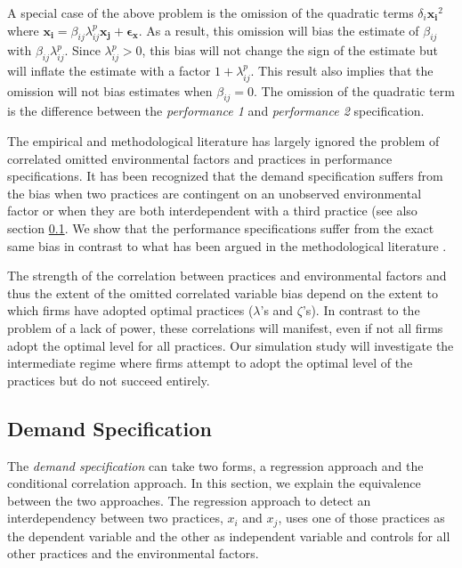 \documentclass[12pt]{article}
\begin{document}
A special case of the above problem is the omission of the quadratic terms $\delta_i \mathbf{x_i}^2$ where $\mathbf{x_i} =  \beta_{ij} \lambda^p_{ij} \mathbf{x_j} + \mathbf{\epsilon_x}$. As a result, this omission will bias the estimate of $\beta_{ij}$ with $\beta_{ij} \lambda^p_{ij}$. Since $\lambda^p_{ij} > 0$, this bias will not change the sign of the estimate but will inflate the estimate with a factor $1 + \lambda^p_{ij}$.  This result also implies that the omission will not bias estimates when $\beta_{ij} = 0$. The omission of the quadratic term is the difference between the \emph{performance 1} and \emph{performance 2} specification.

The empirical and methodological literature has largely ignored the problem of correlated omitted environmental factors and practices in performance specifications. It has been recognized that the demand specification suffers from the bias when two practices are contingent on an unobserved environmental factor or when they are both interdependent with a third practice (see also section \ref{demand-specification}. We show that the performance specifications suffer from the exact same bias in contrast to what has been argued in the methodological literature \citep{Carree2011}. 

The strength of the correlation between practices and environmental factors and thus the extent of the omitted correlated variable bias depend on the extent to which firms have adopted optimal practices ($\lambda$'s and $\zeta$'s). In contrast to the problem of a lack of power, these correlations will manifest, even if not all firms adopt the optimal level for all practices. Our simulation study will investigate the intermediate regime where firms attempt to adopt the optimal level of the practices but do not succeed entirely.

\subsection{Demand Specification}\label{demand-specification}

The \emph{demand specification} can take two forms, a regression approach and the conditional correlation approach. In this section, we explain the equivalence between the two approaches. The regression  approach to detect an interdependency between two practices, $x_i$ and $x_j$, uses one of those practices as the dependent variable and the other as independent variable and controls for all other practices and the environmental factors.
\end{document}
